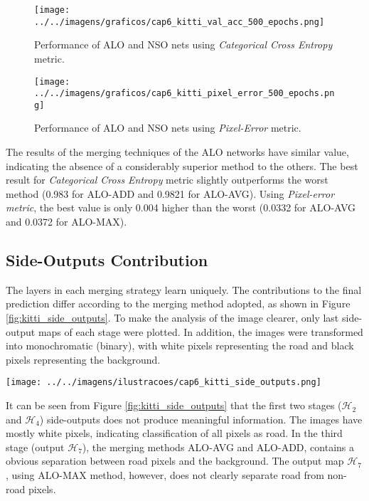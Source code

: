 \begin{figure}
  \centering
  \caption{Performance of ALO and NSO nets using \textit{Categorical Cross Entropy} metric.}
  \texttt{[image: ../../imagens/graficos/cap6\_kitti\_val\_acc\_500\_epochs.png]}
  \sourceOwn
  \label{fig:kitti_cross_entropy_500_epochs}
\end{figure}

\begin{figure}
  \centering
  \caption{Performance of ALO and NSO nets using \textit{Pixel-Error} metric.}
  \texttt{[image: ../../imagens/graficos/cap6\_kitti\_pixel\_error\_500\_epochs.png]}
  \sourceOwn
  \label{fig:kitti_pixel_error_500_epochs}
\end{figure}

The results of the merging techniques of the ALO networks have similar value, indicating the absence of a considerably superior method to the others.
The best result for \textit{Categorical Cross Entropy} metric slightly outperforms the worst method (0.983 for ALO-ADD and 0.9821 for ALO-AVG).
Using \textit{Pixel-error metric}, the best value is only 0.004 higher than the worst (0.0332 for ALO-AVG and 0.0372 for ALO-MAX).

\subsection{Side-Outputs Contribution}
\label{cap6_contribuicoes_saidas_intermediarias}

The layers in each merging strategy learn uniquely.
The contributions to the final prediction differ according to the merging method adopted, as shown in Figure \ref{fig:kitti_side_outputs}.
To make the analysis of the image clearer, only last side-output maps of each stage were plotted.
In addition, the images were transformed into monochromatic (binary), with white pixels representing the road and black pixels representing the background.

\begin{figure*}
  \centering
  \caption{Side-output maps for ALO network merging strategies.}
  \texttt{[image: ../../imagens/ilustracoes/cap6\_kitti\_side\_outputs.png]}
  \sourceOwn
  \label{fig:kitti_side_outputs}
\end{figure*}

It can be seen from Figure \ref{fig:kitti_side_outputs} that the first two stages ($\mathcal{H}_2$ and $\mathcal{H}_4$) side-outputs does not produce meaningful information.
The images have mostly white pixels, indicating classification of all pixels as road.
In the third stage (output $\mathcal{H}_7$), the merging methods ALO-AVG and ALO-ADD, contains a obvious separation between road pixels and the background.
The output map $\mathcal{H}_7$, using ALO-MAX method, however, does not clearly separate road from non-road pixels.

